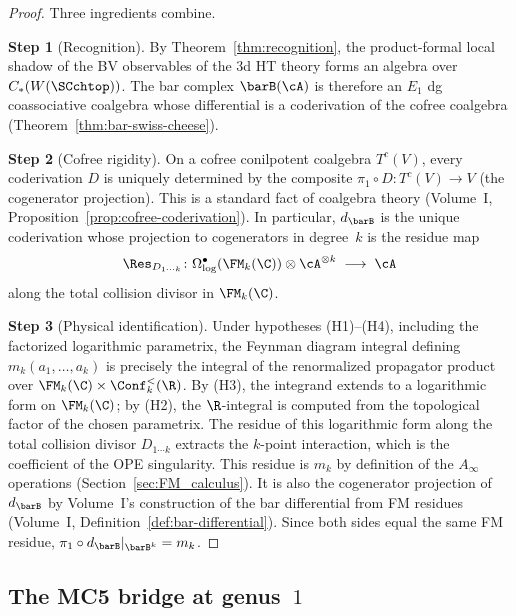 \begin{proof}
Three ingredients combine.

\textbf{Step 1} (Recognition).
By Theorem~\ref{thm:recognition}, the product-formal local shadow of
the BV observables of the 3d HT theory forms an algebra over
$C_\ast(W(\SCchtop))$. The bar complex
$\barB(\cA)$ is therefore an $E_1$ dg coassociative coalgebra
whose differential is a coderivation
of the cofree coalgebra
(Theorem~\ref{thm:bar-swiss-cheese}).

\textbf{Step 2} (Cofree rigidity).
On a cofree conilpotent coalgebra $T^c(V)$, every coderivation
$D$ is uniquely determined by the composite
$\pi_1 \circ D \colon T^c(V) \to V$ (the cogenerator projection).
This is a standard fact of coalgebra theory
\textup{(}Volume~I, Proposition~\ref*{prop:cofree-coderivation}\textup{)}.
In particular, $d_{\barB}$ is the unique coderivation whose
projection to cogenerators in degree~$k$ is the residue map
\[
\Res_{D_{1\cdots k}} \colon
\Omega^\bullet_{\log}(\FM_k(\C)) \otimes \cA^{\otimes k}
\;\longrightarrow\; \cA
\]
along the total collision divisor in $\FM_k(\C)$.

\textbf{Step 3} (Physical identification).
Under hypotheses (H1)--(H4), including the factorized logarithmic
parametrix, the Feynman diagram integral defining
$m_k(a_1, \ldots, a_k)$ is precisely the integral of the
renormalized propagator product over $\FM_k(\C) \times
\Conf_k^{<}(\R)$. By (H3), the integrand extends to a
logarithmic form on $\FM_k(\C)$; by (H2), the $\R$-integral is
computed from the topological factor of the chosen parametrix. The
residue of this logarithmic form along the total collision
divisor $D_{1\cdots k}$ extracts the $k$-point interaction, which
is the coefficient of the OPE singularity. This residue is
$m_k$ by definition of the $A_\infty$ operations
(Section~\ref{sec:FM_calculus}). It is also the cogenerator
projection of $d_{\barB}$ by Volume~I's construction of the bar
differential from FM residues
(Volume~I, Definition~\ref*{def:bar-differential}).
Since both sides equal the same FM residue,
$\pi_1 \circ d_{\barB}|_{\barB^k} = m_k$.
\end{proof}

\subsection{The MC5 bridge at genus~$1$}

